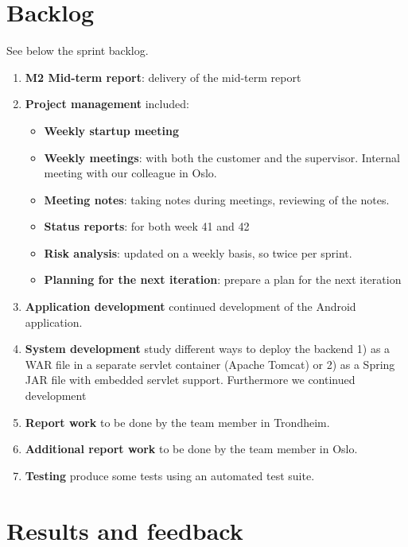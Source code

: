 
\section{Backlog}
See below the sprint backlog.

\begin{enumerate}[1.]
\item \textbf{M2 Mid-term report}:
	delivery of the mid-term report
\item \textbf{Project management} included:
	\begin{itemize}
		\item \textbf{Weekly startup meeting}
		\item \textbf{Weekly meetings}: 
			with both the customer and the supervisor. Internal meeting with our colleague in Oslo.
		\item \textbf{Meeting notes}:
			taking notes during meetings, reviewing of the notes.
		\item \textbf{Status reports}:
			for both week 41 and 42
		\item \textbf{Risk analysis}:
			updated on a weekly basis, so twice per sprint.
		\item \textbf{Planning for the next iteration}:
			prepare a plan for the next iteration
	\end{itemize}
	\item \textbf{Application development}\newline
		continued development of the Android application.
	\item \textbf{System development}\newline
		study different ways to deploy the backend
		1) as a WAR file in a separate servlet container (Apache Tomcat) or 2) as a Spring JAR file
		with embedded servlet support. Furthermore we continued development
	\item \textbf{Report work}\newline
		to be done by the team member in Trondheim.
	\item \textbf{Additional report work}\newline
		to be done by the team member in Oslo.
	\item \textbf{Testing}\newline
		produce some tests using an automated test suite.
\end{enumerate}

\section{Results and feedback}

